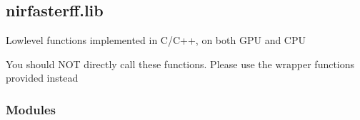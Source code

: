 \documentclass[letterpaper,10pt,english]{sphinxmanual}
\begin{document}
\sphinxstepscope


\subsection{nirfasterff.lib}
\label{\detokenize{_autosummary/nirfasterff.lib:module-nirfasterff.lib}}\label{\detokenize{_autosummary/nirfasterff.lib:nirfasterff-lib}}\label{\detokenize{_autosummary/nirfasterff.lib::doc}}
\sphinxAtStartPar
Low\sphinxhyphen{}level functions implemented in C/C++, on both GPU and CPU

\sphinxAtStartPar
You should NOT directly call these functions. Please use the wrapper functions provided instead
\subsubsection*{Modules}
\end{document}
